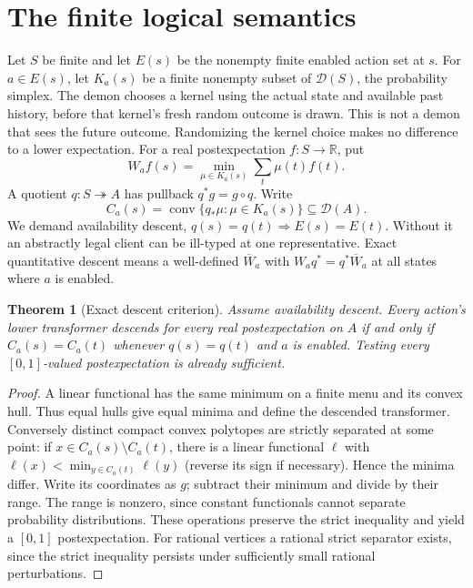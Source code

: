 \documentclass[11pt]{article}
\newtheorem{theorem}{Theorem}\newtheorem{proposition}{Proposition}
\begin{document}
\section{The finite logical semantics}
Let $S$ be finite and let $E(s)$ be the nonempty finite enabled action set at $s$. For $a\in E(s)$, let $K_a(s)$ be a finite nonempty subset of $\mathcal D(S)$, the probability simplex. The demon chooses a kernel using the actual state and available past history, before that kernel's fresh random outcome is drawn. This is not a demon that sees the future outcome. Randomizing the kernel choice makes no difference to a lower expectation.
For a real postexpectation $f:S\to\mathbb R$, put
\[
 W_af(s)=\min_{\mu\in K_a(s)}\sum_t\mu(t)f(t).
\]
A quotient $q:S\twoheadrightarrow A$ has pullback $q^*g=g\circ q$. Write
\[
 C_a(s)=\operatorname{conv}\{q_*\mu:\mu\in K_a(s)\}\subseteq\mathcal D(A).
\]
We demand availability descent, $q(s)=q(t)\Rightarrow E(s)=E(t)$. Without it an abstractly legal client can be ill-typed at one representative. Exact quantitative descent means a well-defined $\overline W_a$ with $W_aq^*=q^*\overline W_a$ at all states where $a$ is enabled.

\begin{theorem}[Exact descent criterion]\label{thm:criterion}
Assume availability descent. Every action's lower transformer descends for every real postexpectation on $A$ if and only if $C_a(s)=C_a(t)$ whenever $q(s)=q(t)$ and $a$ is enabled. Testing every $[0,1]$-valued postexpectation is already sufficient.
\end{theorem}
\begin{proof}
A linear functional has the same minimum on a finite menu and its convex hull. Thus equal hulls give equal minima and define the descended transformer. Conversely distinct compact convex polytopes are strictly separated at some point: if $x\in C_a(s)\setminus C_a(t)$, there is a linear functional $\ell$ with $\ell(x)<\min_{y\in C_a(t)}\ell(y)$ (reverse its sign if necessary). Hence the minima differ. Write its coordinates as $g$; subtract their minimum and divide by their range. The range is nonzero, since constant functionals cannot separate probability distributions. These operations preserve the strict inequality and yield a $[0,1]$ postexpectation. For rational vertices a rational strict separator exists, since the strict inequality persists under sufficiently small rational perturbations.
\end{proof}
\end{document}

